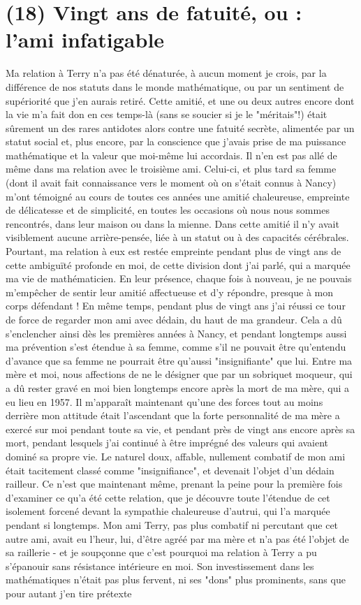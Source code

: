 \section{(18) Vingt ans de fatuité, ou : l'ami infatigable}

Ma relation à Terry n'a pas été dénaturée, à aucun moment je crois, par la différence de nos statuts dans le monde mathématique, ou par un sentiment de supériorité que j'en aurais retiré. Cette amitié, et une ou deux autres encore dont la vie m'a fait don en ces temps-là (sans se soucier si je le "méritais"!) était sûrement un des rares antidotes alors contre une fatuité secrète, alimentée par un statut social et, plus encore, par la conscience que j'avais prise de ma puissance mathématique et la valeur que moi-même lui accordais. Il n'en est pas allé de même dans ma relation avec le troisième ami. Celui-ci, et plus tard sa femme (dont il avait fait connaissance vers le moment où on s'était connus à Nancy) m'ont témoigné au cours de toutes ces années une amitié chaleureuse, empreinte de délicatesse et de simplicité, en toutes les occasions où nous nous sommes rencontrés, dans leur maison ou dans la mienne. Dans cette amitié il n'y avait visiblement aucune arrière-pensée, liée à un statut ou à des capacités cérébrales. Pourtant, ma relation à eux est restée empreinte pendant plus de vingt ans de cette ambiguïté profonde en moi, de cette division dont j'ai parlé, qui a marquée ma vie de mathématicien. En leur présence, chaque fois à nouveau, je ne pouvais m'empêcher de sentir leur amitié affectueuse et d'y répondre, presque à mon corps défendant ! En même temps, pendant plus de vingt ans j'ai réussi ce tour de force de regarder mon ami avec dédain, du haut de ma grandeur. Cela a dû s'enclencher ainsi dès les premières années à Nancy, et pendant longtemps aussi ma prévention s'est étendue à sa femme, comme s'il ne pouvait être qu'entendu d'avance que sa femme ne pourrait être qu'aussi "insignifiante" que lui. Entre ma mère et moi, nous affections de ne le désigner que par un sobriquet moqueur, qui a dû rester gravé en moi bien longtemps encore après la mort de ma mère, qui a eu lieu en 1957. Il m'apparaît maintenant qu'une des forces tout au moins derrière mon attitude était l'ascendant que la forte personnalité de ma mère a exercé sur moi pendant toute sa vie, et pendant près de vingt ans encore après sa mort, pendant lesquels j'ai continué à être imprégné des valeurs qui avaient dominé sa propre vie. Le naturel doux, affable, nullement combatif de mon ami était tacitement classé comme "insignifiance", et devenait l'objet d'un dédain railleur. Ce n'est que maintenant même, prenant la peine pour la première fois d'examiner ce qu'a été cette relation, que je découvre toute l'étendue de cet isolement forcené devant la sympathie chaleureuse d'autrui, qui l'a marquée pendant si longtemps. Mon ami Terry, pas plus combatif ni percutant que cet autre ami, avait eu l'heur, lui, d'être agréé par ma mère et n'a pas été l'objet de sa raillerie - et je soupçonne que c'est pourquoi ma relation à Terry a pu s'épanouir sans résistance intérieure en moi. Son investissement dans les mathématiques n'était pas plus fervent, ni ses "dons" plus prominents, sans que pour autant j'en tire prétexte 